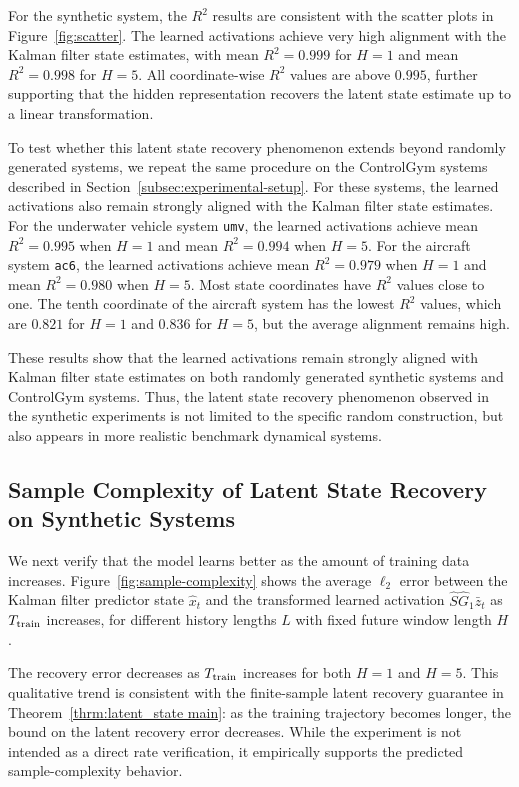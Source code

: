 \documentclass[11pt]{article}
\newcommand{\<}{\langle}
\renewcommand{\>}{\rangle}
\numberwithin{equation}{section}
\begin{document}
For the synthetic system, the \(R^2\) results are consistent with the scatter plots in Figure~\ref{fig:scatter}. The learned activations achieve very high alignment with the Kalman filter state estimates, with mean \(R^2 = 0.999\) for \(H=1\) and mean \(R^2 = 0.998\) for \(H=5\). All coordinate-wise \(R^2\) values are above \(0.995\), further supporting that the hidden representation recovers the latent state estimate up to a linear transformation.

To test whether this latent state recovery phenomenon extends beyond randomly generated systems, we repeat the same procedure on the ControlGym systems described in Section~\ref{subsec:experimental-setup}. 
For these systems, the learned activations also remain strongly aligned with the Kalman filter state estimates. For the underwater vehicle system \texttt{umv}, the learned activations achieve mean \(R^2 = 0.995\) when \(H=1\) and mean \(R^2 = 0.994\) when \(H=5\). For the aircraft system \texttt{ac6}, the learned activations achieve mean \(R^2 = 0.979\) when \(H=1\) and mean \(R^2 = 0.980\) when \(H=5\). Most state coordinates have \(R^2\) values close to one. The tenth coordinate of the aircraft system has the lowest \(R^2\) values, which are \(0.821\) for \(H=1\) and \(0.836\) for \(H=5\), but the average alignment remains high.

These results show that the learned activations remain strongly aligned with Kalman filter state estimates on both randomly generated synthetic systems and ControlGym systems. Thus, the latent state recovery phenomenon observed in the synthetic experiments is not limited to the specific random construction, but also appears in more realistic benchmark dynamical systems.

\subsection{Sample Complexity of Latent State Recovery on Synthetic Systems}

We next verify that the model learns better as the amount of training data increases. Figure~\ref{fig:sample-complexity} shows the average $\ell_2$ error between the Kalman filter predictor state $\hat x_t$ and the transformed learned activation $\hat S \hat G_1 \bar z_t$ as $T_{\rm train}$ increases, for different history lengths $L$ with fixed future window length $H$. 

The recovery error decreases as $T_{\rm train}$ increases for both $H=1$ and $H=5$. This qualitative trend is consistent with the finite-sample latent recovery guarantee in Theorem~\ref{thrm:latent_state main}: as the training trajectory becomes longer, the bound on the latent recovery error decreases. While the experiment is not intended as a direct rate verification, it empirically supports the predicted sample-complexity behavior.
\end{document}
